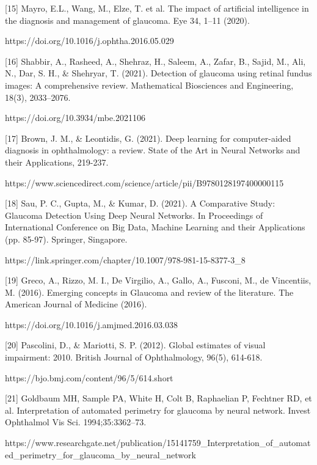 \vspace{5mm}
[15]  Mayro, E.L., Wang, M., Elze, T. et al. The impact of artificial intelligence in the diagnosis and management of glaucoma. Eye 34, 1–11 (2020). 

https://doi.org/10.1016/j.ophtha.2016.05.029

\vspace{5mm}
[16]  Shabbir, A., Rasheed, A., Shehraz, H., Saleem, A., Zafar, B., Sajid, M., Ali, N., Dar, S. H., & Shehryar, T. (2021). Detection of glaucoma using retinal fundus images: A comprehensive review. Mathematical Biosciences and Engineering, 18(3), 2033–2076. 

https://doi.org/10.3934/mbe.2021106

\vspace{5mm}
[17] Brown, J. M., & Leontidis, G. (2021). Deep learning for computer-aided diagnosis in ophthalmology: a review. State of the Art in Neural Networks and their Applications, 219-237.


https://www.sciencedirect.com/science/article/pii/B9780128197400000115

\vspace{5mm}
[18] Sau, P. C., Gupta, M., & Kumar, D. (2021). A Comparative Study: Glaucoma Detection Using Deep Neural Networks. In Proceedings of International Conference on Big Data, Machine Learning and their Applications (pp. 85-97). Springer, Singapore.

https://link.springer.com/chapter/10.1007/978-981-15-8377-3_8

\vspace{5mm}
[19] Greco, A., Rizzo, M. I., De Virgilio, A., Gallo, A., Fusconi, M., de Vincentiis, M. (2016). Emerging concepts in Glaucoma and review of the literature. The American Journal of Medicine (2016).

https://doi.org/10.1016/j.amjmed.2016.03.038

\vspace{5mm}
[20] Pascolini, D., & Mariotti, S. P. (2012). Global estimates of visual impairment: 2010. British Journal of Ophthalmology, 96(5), 614-618.

https://bjo.bmj.com/content/96/5/614.short

\vspace{5mm}
[21] Goldbaum MH, Sample PA, White H, Colt B, Raphaelian P, Fechtner RD, et al. Interpretation of automated perimetry for glaucoma by neural network. Invest Ophthalmol Vis Sci. 1994;35:3362–73. 

https://www.researchgate.net/publication/15141759_Interpretation_of_automated_perimetry_for_glaucoma_by_neural_network

